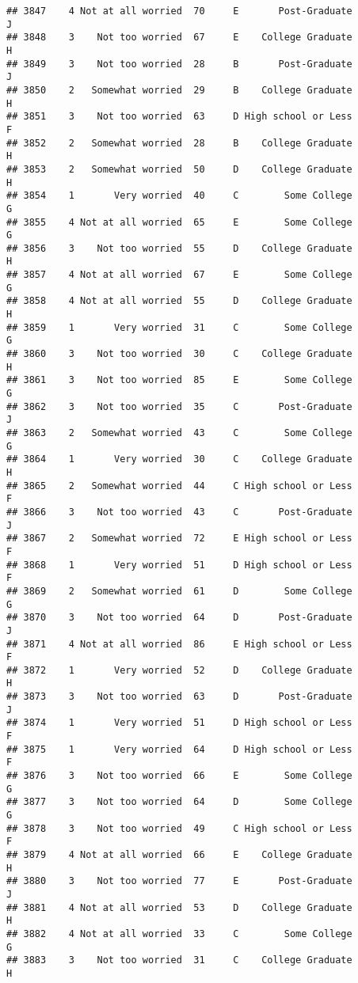 \documentclass[
]{article}
\begin{document}
\begin{verbatim}
## 3847    4 Not at all worried  70     E       Post-Graduate         J
## 3848    3    Not too worried  67     E    College Graduate         H
## 3849    3    Not too worried  28     B       Post-Graduate         J
## 3850    2   Somewhat worried  29     B    College Graduate         H
## 3851    3    Not too worried  63     D High school or Less         F
## 3852    2   Somewhat worried  28     B    College Graduate         H
## 3853    2   Somewhat worried  50     D    College Graduate         H
## 3854    1       Very worried  40     C        Some College         G
## 3855    4 Not at all worried  65     E        Some College         G
## 3856    3    Not too worried  55     D    College Graduate         H
## 3857    4 Not at all worried  67     E        Some College         G
## 3858    4 Not at all worried  55     D    College Graduate         H
## 3859    1       Very worried  31     C        Some College         G
## 3860    3    Not too worried  30     C    College Graduate         H
## 3861    3    Not too worried  85     E        Some College         G
## 3862    3    Not too worried  35     C       Post-Graduate         J
## 3863    2   Somewhat worried  43     C        Some College         G
## 3864    1       Very worried  30     C    College Graduate         H
## 3865    2   Somewhat worried  44     C High school or Less         F
## 3866    3    Not too worried  43     C       Post-Graduate         J
## 3867    2   Somewhat worried  72     E High school or Less         F
## 3868    1       Very worried  51     D High school or Less         F
## 3869    2   Somewhat worried  61     D        Some College         G
## 3870    3    Not too worried  64     D       Post-Graduate         J
## 3871    4 Not at all worried  86     E High school or Less         F
## 3872    1       Very worried  52     D    College Graduate         H
## 3873    3    Not too worried  63     D       Post-Graduate         J
## 3874    1       Very worried  51     D High school or Less         F
## 3875    1       Very worried  64     D High school or Less         F
## 3876    3    Not too worried  66     E        Some College         G
## 3877    3    Not too worried  64     D        Some College         G
## 3878    3    Not too worried  49     C High school or Less         F
## 3879    4 Not at all worried  66     E    College Graduate         H
## 3880    3    Not too worried  77     E       Post-Graduate         J
## 3881    4 Not at all worried  53     D    College Graduate         H
## 3882    4 Not at all worried  33     C        Some College         G
## 3883    3    Not too worried  31     C    College Graduate         H

\end{verbatim}
\end{document}
